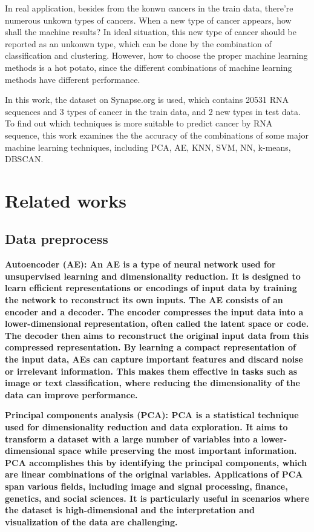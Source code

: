\documentclass[twocolumn,10pt]{article}
\begin{document}
In real application, besides from the konwn cancers in the train data, there're numerous unkown types of cancers. 
When a new type of cancer appears, how shall the machine results? In ideal situation, this new type of cancer should be 
reported as an unkonwn type, which can be done by the combination of classification and clustering. 
However, how to choose the proper machine learning methods is a hot potato, since the different combinations 
of machine learning methods have different performance. 

In this work, the dataset on Synapse.org is used, which contains 20531 RNA sequences and 3 types of cancer 
in the train data, and 2 new types in test data. To find out which techniques is more suitable to predict 
cancer by RNA sequence, this work examines the the accuracy of the combinations of some major machine 
learning techniques, including PCA, AE, KNN, SVM, NN, k-means, DBSCAN. 

\section{Related works}
\label{sec:Related works}

\subsection*{Data preprocess}

\bf{Autoencoder (AE)}: \rm{An} AE is a type of neural network used for unsupervised 
learning and dimensionality reduction. It is designed to learn efficient representations or encodings of 
input data by training the network to reconstruct its own inputs. The AE consists of an encoder 
and a decoder. The encoder compresses the input data into a lower-dimensional representation, often called 
the latent space or code. The decoder then aims to reconstruct the original input data from this compressed 
representation. By learning a compact representation of the input data, AEs can capture important features 
and discard noise or irrelevant information. This makes them effective in tasks such as image or 
text classification, where reducing the dimensionality of the data can improve performance.

\bf{Principal components analysis (PCA)}: \rm{PCA} is a statistical technique used for dimensionality 
reduction and data exploration. It aims to transform a dataset with a large number of variables into 
a lower-dimensional space while preserving the most important information. PCA accomplishes this by 
identifying the principal components, which are linear combinations of the original variables. 
Applications of PCA span various fields, including image and signal processing, finance, genetics, 
and social sciences. It is particularly useful in scenarios where the dataset is high-dimensional 
and the interpretation and visualization of the data are challenging.
\end{document}
